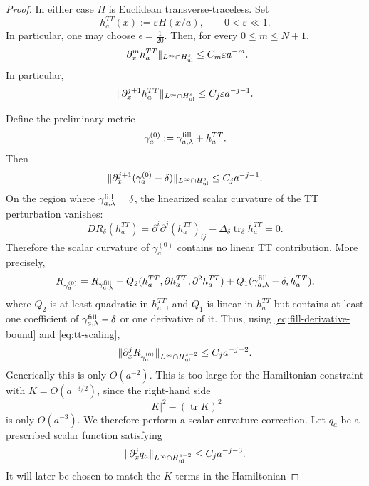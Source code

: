 \documentclass{amsart}
\begin{document}
{\begin{proof}
\noindent In either case \(H\) is Euclidean transverse-traceless. Set
\[
        h_a^{TT}(x):=\varepsilon H(x/a),
        \qquad 0<\varepsilon\ll1.
\]
In particular, one may choose $\epsilon =\frac{1}{20}$.
Then, for every \(0\le m\le N+1\),
\begin{equation}
\label{eq:tt-scaling}
        \|\partial_x^m h_a^{TT}\|_{L^\infty\cap H^s_{\rm ul}}
        \le C_m\varepsilon a^{-m}.
\end{equation}
In particular,
\[
        \|\partial_x^{j+1}h_a^{TT}\|_{L^\infty\cap H^s_{\rm ul}}
        \le C_j\varepsilon a^{-j-1}.
\]

\noindent Define the preliminary metric
\[
        \gamma_a^{(0)}
        :=
        \gamma^{\rm fill}_{a,\lambda}+h_a^{TT}.
\]
Then
\[
        \|\partial_x^{j+1}(\gamma_a^{(0)}-\delta)\|_{L^\infty\cap H^s_{\rm ul}}
        \le C_j a^{-j-1}.
\]
On the region where \(\gamma^{\rm fill}_{a,\lambda}=\delta\), the
linearized scalar curvature of the TT perturbation vanishes:
\[
        D R_{\delta}(h_a^{TT})
        =
        \partial^i\partial^j(h_a^{TT})_{ij}
        -
        \Delta_\delta\operatorname{tr}_{\delta}h_a^{TT}
        =
        0.
\]
Therefore the scalar curvature of \(\gamma_a^{(0)}\) contains no linear
TT contribution. More precisely,
\[
        R_{\gamma_a^{(0)}}
        =
        R_{\gamma^{\rm fill}_{a,\lambda}}
        +
        Q_2(h_a^{TT},\partial h_a^{TT},\partial^2h_a^{TT})
        +
        Q_1(\gamma^{\rm fill}_{a,\lambda}-\delta,h_a^{TT}),
\]
where \(Q_2\) is at least quadratic in \(h_a^{TT}\), and \(Q_1\) is
linear in \(h_a^{TT}\) but contains at least one coefficient of
\(\gamma^{\rm fill}_{a,\lambda}-\delta\) or one derivative of it. Thus,
using \eqref{eq:fill-derivative-bound} and \eqref{eq:tt-scaling},
\begin{equation}
\label{eq:raw-scalar-bound}
        \|\partial_x^j R_{\gamma_a^{(0)}}\|_{L^\infty\cap H^{s-2}_{\rm ul}}
        \le C_j a^{-j-2}.
\end{equation}
Generically this is only \(O(a^{-2})\). This is too large for the
Hamiltonian constraint with \(K=O(a^{-3/2})\), since the right-hand side
\[
        |K|^2-(\operatorname{tr}K)^2
\]
is only \(O(a^{-3})\). We therefore perform a scalar-curvature correction. Let \(q_a\) be a prescribed scalar function satisfying
\begin{equation}
\label{eq:q-bound}
        \|\partial_x^j q_a\|_{L^\infty\cap H^{s-2}_{\rm ul}}
        \le C_j a^{-j-3}.
\end{equation}
It will later be chosen to match the \(K\)-terms in the Hamiltonian

\end{proof}}
\end{document}
